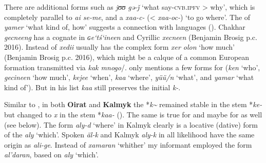 There are additional forms such as  \textit{jʊʊ gə-ǰ} ‘what say-\textsc{cvb.ipfv} > why’, which is completely parallel to  \textit{ai se-me}, and a   \textit{xaa-c-} (< \textit{xaa-oc-}) ‘to go where’. The  of \textit{yamer} ‘what kind of, how’ suggests a connection with  languages (). Chakhar \textit{gecneeng} has a cognate in  \textit{ɢe‘tś‘ineen} and Cyrillic  \textit{xecneen} (Benjamin Brosig p.c. 2016). Instead of \textit{xedii}  usually has the complex form \textit{xer olon} ‘how much’ (Benjamin Brosig p.c. 2016), which might be a calque of a common European formation transmitted via  \textit{kak mnogo}/. \citet[202]{Georg2003a} only mentions a few forms for  (\textit{ken} ‘who’, \textit{gecineen} ‘how much’, \textit{kejee} ‘when’, \textit{kaa} ‘where’, \textit{yüü/n} ‘what’, and \textit{yamar} ‘what kind of’). But in his list \textit{kaa} still preserves the initial \textit{k-}.

\newpage 
Similar to , in both \textbf{Oirat} and \textbf{Kalmyk} the *\textit{k{\textasciitilde}} remained stable in the stem *\textit{ke-} but changed to \textit{x} in the stem *\textit{kaa-} (). The same is true for  and maybe for  as well (see below). The form \textit{aly-}\textit{d} ‘where’ in Kalmyk clearly is a locative (dative) form of the  \textit{aly} ‘which’. Spoken  \textit{äl-k} and Kalmyk \textit{aly-k} in all likelihood have the same origin as  \textit{ali-ge}. Instead of  \textit{xamaran} ‘whither’ my informant employed the form \textit{al’daran}, based on \textit{aly} ‘which’.

